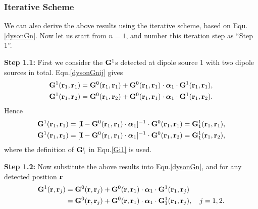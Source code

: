 \subsubsection{Iterative Scheme}\label{section:GFiterative}

We can also derive the above results using the iterative scheme, based on Equ.\eqref{dysonGn}. Now let us start from $n=1$, and number this iteration step as ``Step 1''.

{\textbf {Step 1.1:}} First we consider the $\mathbf{G}^1$s detected at dipole source 1 with two dipole sources in total.
Equ.\eqref{dysonGnij} gives
\begin{subequations}
\begin{align}
\mathbf{G}^1(\mathbf{r}_1,\mathbf{r}_1)
&= \mathbf{G}^{0}(\mathbf{r}_1,\mathbf{r}_1)+{\mathbf{G}^{0}(\mathbf{r}_1,\mathbf{r}_1) \cdot {\bm \alpha}_1\cdot \mathbf{G}^1(\mathbf{r}_1,\mathbf{r}_1)},\\
\mathbf{G}^1(\mathbf{r}_1,\mathbf{r}_2)
&= \mathbf{G}^{0}(\mathbf{r}_1,\mathbf{r}_2)+{\mathbf{G}^{0}(\mathbf{r}_1,\mathbf{r}_1) \cdot {\bm \alpha}_1\cdot \mathbf{G}^1(\mathbf{r}_1,\mathbf{r}_2)}.
\end{align}
\end{subequations}
Hence
\begin{subequations}
\begin{align}
\mathbf{G}^1(\mathbf{r}_1,\mathbf{r}_1)
&= [\mathbf{I}- \mathbf{G}^{0}(\mathbf{r}_1,\mathbf{r}_1) \cdot {\bm \alpha}_1]^{-1}\cdot \mathbf{G}^{0}(\mathbf{r}_1,\mathbf{r}_1)=\mathbf{G}^1_1(\mathbf{r}_1,\mathbf{r}_1),\\
\mathbf{G}^1(\mathbf{r}_1,\mathbf{r}_2)
&= [\mathbf{I}- \mathbf{G}^{0}(\mathbf{r}_1,\mathbf{r}_1) \cdot {\bm \alpha}_1]^{-1}\cdot \mathbf{G}^{0}(\mathbf{r}_1,\mathbf{r}_2)=\mathbf{G}^1_1(\mathbf{r}_1,\mathbf{r}_2),
\end{align}
\end{subequations}
where the definition of $\mathbf{G}^i_1$ in Equ.\eqref{Gi1} is used.

{\bf{Step 1.2:}} Now substitute the above results into Equ.\eqref{dysonGn}, and for any detected position $\mathbf{r}$
\begin{equation}
\label{G1rr}
\begin{aligned}
\mathbf{G}^1(\mathbf{r},\mathbf{r}_j) &=\mathbf{G}^{0}(\mathbf{r},\mathbf{r}_j)+{\mathbf{G}^{0}(\mathbf{r},\mathbf{r}_1) \cdot {\bm \alpha}_1\cdot \mathbf{G}^1(\mathbf{r}_1,\mathbf{r}_j)} \\
&= \mathbf{G}^{0}(\mathbf{r},\mathbf{r}_j)+{\mathbf{G}^{0}(\mathbf{r},\mathbf{r}_1) \cdot {\bm \alpha}_1\cdot \mathbf{G}^1_1(\mathbf{r}_1,\mathbf{r}_j)},\quad j=1,2.
\end{aligned}
\end{equation}

